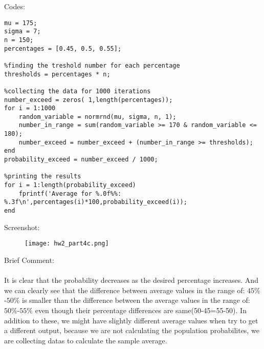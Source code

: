 \documentclass[12pt]{article}
\begin{document}
Codes:\\
\begin{lstlisting}[style=Matlab-editor]
%datas
mu = 175;
sigma = 7;
n = 150;
percentages = [0.45, 0.5, 0.55];

%finding the treshold number for each percentage
thresholds = percentages * n;

%collecting the data for 1000 iterations 
number_exceed = zeros( 1,length(percentages));
for i = 1:1000
    random_variable = normrnd(mu, sigma, n, 1);
    number_in_range = sum(random_variable >= 170 & random_variable <= 180);
    number_exceed = number_exceed + (number_in_range >= thresholds);
end
probability_exceed = number_exceed / 1000;

%printing the results
for i = 1:length(probability_exceed)
    fprintf('Average for %.0f%%: %.3f\n',percentages(i)*100,probability_exceed(i));
end

\end{lstlisting}
Screenshot:\\
\begin{figure}[H]
  \texttt{[image: hw2\_part4c.png]}
  \centering
  \label{fig 3:Output}
\end{figure}
Brief Comment:\\\\
It is clear that the probability decreases as the desired percentage increases. And we can clearly see that the difference between average values in the range of: $45\%$-$50\%$ is smaller than the difference between the average values in the range of: $50\%$-$55\%$ even though their percentage differences are same(50-45=55-50). In addition to these, we might have slightly different average values when try to get a different output, because we are not calculating the population probabilites, we are collecting datas to calculate the sample average.
\end{document}

